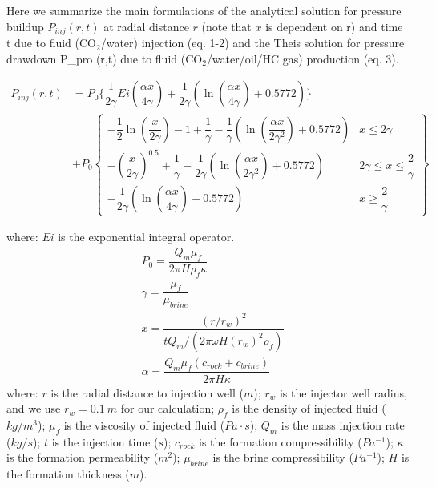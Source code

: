 Here we summarize the main formulations of the analytical solution for pressure buildup $P_{inj}(r,t)$  at radial distance $r$ (note that $x$ is dependent on r) and time t due to fluid (CO$_{2}$/water) injection  \cite[]{mathias2009approximate} (eq. 1-2) and the Theis solution for pressure drawdown P\_pro (r,t) due to fluid (CO$_{2}$/water/oil/HC gas) production (eq. 3).

\begin{equation}
\begin{aligned}
P_{inj}(r,t) & = P_{0}\{\dfrac{1}{2\gamma}Ei(\dfrac{\alpha x}{4\gamma})+\dfrac{1}{2\gamma}(\ln(\dfrac{\alpha x}{4\gamma})+0.5772)\} \\
& + P_{0}
\left\lbrace
  \begin{array}{lr}
  -\dfrac{1}{2}\ln(\dfrac{x}{2\gamma})-1 + \dfrac{1}{\gamma} - \dfrac{1}{\gamma}(\ln(\dfrac{\alpha x}{2\gamma^2})+0.5772) & x\leq 2\gamma \\
  -(\dfrac{x}{2\gamma})^{0.5} + \dfrac{1}{\gamma} - \dfrac{1}{2\gamma}(\ln(\dfrac{\alpha x}{2\gamma^2})+0.5772) & 2\gamma \leq x\leq \dfrac{2}{\gamma} \\
  -\dfrac{1}{2\gamma}(\ln(\dfrac{\alpha x}{4\gamma})+0.5772) & x\geq \dfrac{2}{\gamma} 
  \end{array}
\right\rbrace 
\end{aligned} 
\end{equation} 

where:
$Ei$ is the exponential integral operator.
\begin{equation}
\begin{aligned}
& P_{0} = \dfrac{Q_m\mu_f}{2\pi H \rho_{f} \kappa} \\
& \gamma = \dfrac{\mu_{f}}{\mu_{brine}} \\
& x = \dfrac{(r/r_w)^2}{tQ_m/(2\pi\omega H(r_w)^2 \rho_f)} \\
& \alpha = \dfrac{Q_m \mu_f (c_{rock}+c_{brine})}{2\pi H \kappa}
\end{aligned}
\end{equation}
where: 
$r$ is the radial distance to injection well ($m$); $r_w$ is the injector well radius, and we use $r_w = 0.1\ m$ for our calculation; $\rho_f$ is the density of injected fluid ($kg/m^3$); $\mu_f$ is the viscosity of injected fluid ($Pa\cdot s$); $Q_m$ is the mass injection rate ($kg/s$); $t$ is the injection time ($s$); $c_{rock}$ is the formation compressibility ($Pa^{-1}$); $\kappa$ is the formation permeability ($m^2$); $\mu_{brine}$ is the brine compressibility ($Pa^{-1}$); $H$ is the formation thickness ($m$). 


